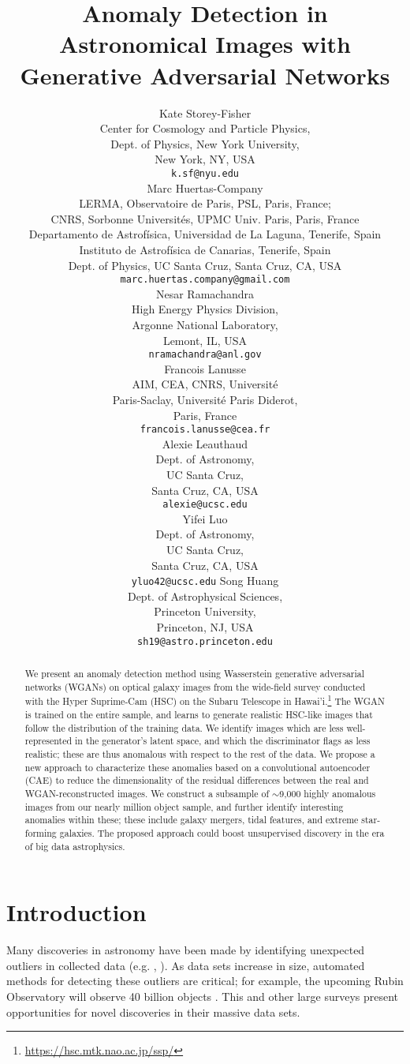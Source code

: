 \documentclass{article}
\title{Anomaly Detection in Astronomical Images with Generative Adversarial Networks}
\author{%
    {Kate Storey-Fisher}\\
    Center for Cosmology and Particle Physics,\\
    Dept. of Physics, New York University,\\
    New York, NY, USA\\
    \texttt{k.sf@nyu.edu}\\
    \And
    Marc Huertas-Company \\
    LERMA, Observatoire de Paris, PSL, Paris, France;\\
    CNRS, Sorbonne Universit\'es,
    UPMC Univ. Paris, Paris, France\\
    Departamento de Astrof\'isica, Universidad de La Laguna, Tenerife, Spain\\
    Instituto de Astrof\'isica de Canarias, Tenerife, Spain\\
    Dept. of Physics, UC Santa Cruz, Santa Cruz, CA, USA\\
    \texttt{marc.huertas.company@gmail.com} \\
    \And
    Nesar Ramachandra \\
    High Energy Physics Division,\\ Argonne National Laboratory, \\
    Lemont, IL, USA\\
    \texttt{nramachandra@anl.gov} \\
    \And
    Francois Lanusse \\
    AIM, CEA, CNRS, Universit\'e\\Paris-Saclay, Universit\'e Paris Diderot, \\
    Paris, France\\
    \texttt{francois.lanusse@cea.fr}\\
    \AND
    Alexie Leauthaud \\
    Dept. of Astronomy, \\ UC Santa Cruz,\\
    Santa Cruz, CA, USA  \\
    \texttt{alexie@ucsc.edu}\\
    \And
    Yifei Luo \\
    Dept. of Astronomy, \\ UC Santa Cruz,\\
    Santa Cruz, CA, USA  \\
    \texttt{yluo42@ucsc.edu}
    \And
    Song Huang \\
    Dept. of Astrophysical Sciences,\\
    Princeton University,\\
    Princeton, NJ, USA\\
    \texttt{sh19@astro.princeton.edu}
}
\begin{document}
\maketitle

\begin{abstract}
    We present an anomaly detection method using Wasserstein generative adversarial networks (WGANs) on optical galaxy images from the wide-field survey conducted with the Hyper Suprime-Cam (HSC) on the Subaru Telescope in Hawai'i.\footnote{\url{https://hsc.mtk.nao.ac.jp/ssp/}}
    The WGAN is trained on the entire sample, and learns to generate realistic HSC-like images that follow the distribution of the training data.
    We identify images which are less well-represented in the generator's latent space, and which the discriminator flags as less realistic; these are thus anomalous with respect to the rest of the data.
    We propose a new approach to characterize these anomalies based on a convolutional autoencoder (CAE) to reduce the dimensionality of the residual differences between the real and WGAN-reconstructed images.
    We construct a subsample of $\sim$9,000 highly anomalous images from our nearly million object sample, and further identify interesting anomalies within these; these include galaxy mergers, tidal features, and extreme star-forming galaxies.
    The proposed approach could boost unsupervised discovery in the era of big data astrophysics.
\end{abstract}


\section{Introduction}

Many discoveries in astronomy have been made by identifying unexpected outliers in collected data (e.g. \citealt{Cardamone2009}, \citealt{Massey2019}). 
As data sets increase in size, automated methods for detecting these outliers are critical; for example, the upcoming Rubin Observatory will observe 40 billion objects \citep{Ivezic2018}.
This and other large surveys present opportunities for novel discoveries in their massive data sets.
\end{document}
